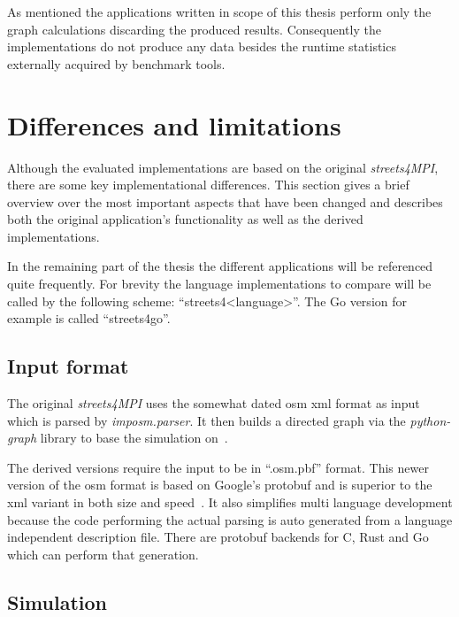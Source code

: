 As mentioned the applications written in scope of this thesis perform only the graph calculations discarding the produced results. Consequently the implementations do not produce any data besides the runtime statistics externally acquired by benchmark tools.

\section{Differences and limitations}
\label{sec:Concept::Differences}

Although the evaluated implementations are based on the original \textit{streets4MPI}, there are some key implementational differences. This section gives a brief overview over the most important aspects that have been changed and describes both the original application's functionality as well as the derived implementations.

In the remaining part of the thesis the different applications will be referenced quite frequently. For brevity the language implementations to compare will be called by the following scheme: ``streets4<language>''. The Go version for example is called ``streets4go''.

\subsection*{Input format}
\label{subsec:Concept::Differences::Input}

The original \textit{streets4MPI} uses the somewhat dated \gls{osm} \gls{xml} format as input which is parsed by \textit{imposm.parser}. It then builds a directed graph via the \textit{python-graph} library to base the simulation on~\cite{streets_report}.

The derived versions require the input to be in ``.osm.pbf'' format. This newer version of the \gls{osm} format is based on Google's \gls{protobuf} and is superior to the \gls{xml} variant in both size and speed~\cite{osm_wiki_pbf}. It also simplifies multi language development because the code performing the actual parsing is auto generated from a language independent description file. There are \gls{protobuf} backends for C, Rust and Go which can perform that generation.

\subsection*{Simulation}
\label{subsec:Concept::Differences::Simulation}

